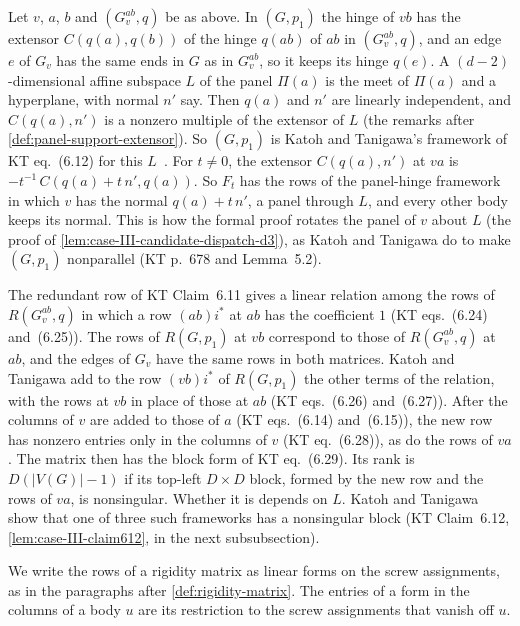 Let $v$, $a$, $b$ and $(G_v^{ab}, q)$ be as above. In $(G, p_1)$ the
hinge of $vb$ has the extensor $C(q(a), q(b))$ of the hinge $q(ab)$ of
$ab$ in $(G_v^{ab}, q)$, and an edge $e$ of $G_v$ has the same ends in
$G$ as in $G_v^{ab}$, so it keeps its hinge $q(e)$. A
$(d-2)$-dimensional affine subspace $L$ of the panel $\Pi(a)$ is the
meet of $\Pi(a)$ and a hyperplane, with normal $n'$ say. Then $q(a)$
and $n'$ are linearly independent, and $C(q(a), n')$ is a nonzero
multiple of the extensor of $L$ (the remarks after
\cref{def:panel-support-extensor}). So $(G, p_1)$ is Katoh and
Tanigawa's framework of KT eq.~(6.12) for this
$L$~\cite[p.~678]{katohTanigawa2011}. For $t \neq 0$, the extensor
$C(q(a), n')$ at $va$ is $-t^{-1}\,C(q(a) + t\,n', q(a))$. So $F_t$ has
the rows of the panel-hinge framework in which $v$ has the normal
$q(a) + t\,n'$, a panel through $L$, and every other body keeps its
normal. This is how the formal proof rotates the panel of $v$ about $L$
(the proof of \cref{lem:case-III-candidate-dispatch-d3}), as Katoh and
Tanigawa do to make $(G, p_1)$ nonparallel (KT p.~678 and Lemma~5.2).

The redundant row of KT Claim~6.11 gives a linear relation among the
rows of $R(G_v^{ab}, q)$ in which a row $(ab)i^*$ at $ab$ has the
coefficient $1$ (KT eqs.~(6.24) and~(6.25)). The rows of $R(G, p_1)$ at
$vb$ correspond to those of $R(G_v^{ab}, q)$ at $ab$, and the edges of
$G_v$ have the same rows in both matrices. Katoh and Tanigawa add to the
row $(vb)i^*$ of $R(G, p_1)$ the other terms of the relation, with the
rows at $vb$ in place of those at $ab$ (KT eqs.~(6.26) and~(6.27)).
After the columns of $v$ are added to those of $a$ (KT eqs.~(6.14)
and~(6.15)), the new row has nonzero entries only in the columns of $v$
(KT eq.~(6.28)), as do the rows of $va$. The matrix then has the block
form of KT eq.~(6.29). Its rank is $D(|V(G)| - 1)$ if its top-left
$D \times D$ block, formed by the new row and the rows of $va$, is
nonsingular. Whether it is depends on $L$. Katoh and Tanigawa show that
one of three such frameworks has a nonsingular block (KT Claim~6.12,
\cref{lem:case-III-claim612}, in the next subsubsection).

We write the rows of a rigidity matrix as linear forms on the screw
assignments, as in the paragraphs after \cref{def:rigidity-matrix}. The
entries of a form in the columns of a body $u$ are its restriction to
the screw assignments that vanish off $u$.

